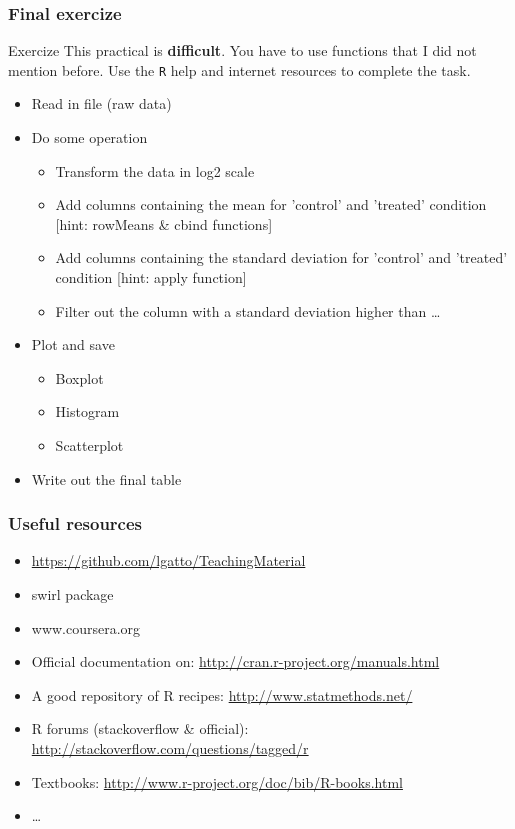 \documentclass{beamer}
\begin{document}
\begin{frame}[fragile]
	\frametitle{Final exercize}
	Exercize
	This practical is \textbf{difficult}. You have to use functions that I did not mention before. Use the \texttt{R} help and internet resources to complete the task.
	\begin{itemize}
		\item Read in file (raw data)
		\item Do some operation
			\begin{itemize}
				\item Transform the data in log2 scale
				\item Add columns containing the mean for 'control' and 'treated' condition \tiny[hint: rowMeans \& cbind functions] \small
				\item Add columns containing the standard deviation for 'control' and 'treated' condition \tiny[hint: apply function] \small
				\item Filter out the column with a standard deviation higher than \ldots
			\end{itemize}
		\item Plot and save
			\begin{itemize}
				\item Boxplot
				\item Histogram
				\item Scatterplot
			\end{itemize}
		\item Write out the final table
	\end{itemize}

\end{frame}



\begin{frame}[fragile]
	\frametitle{Useful resources}
	\begin{itemize}
		\item \url{https://github.com/lgatto/TeachingMaterial}
		\item swirl package
		\item www.coursera.org
		\item Official documentation on: \url{http://cran.r-project.org/manuals.html}
		\item A good repository of R recipes: \url{http://www.statmethods.net/}
		\item R forums (stackoverflow \& official): \url{http://stackoverflow.com/questions/tagged/r}
		\item Textbooks: \url{http://www.r-project.org/doc/bib/R-books.html}
		\item \ldots
	\end{itemize}
\end{frame}
\end{document}
